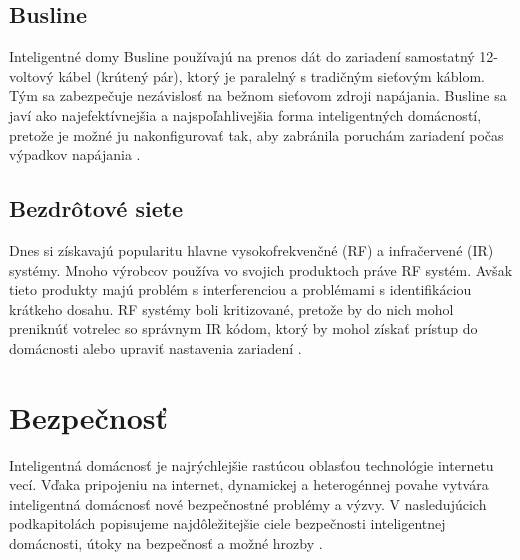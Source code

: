 \documentclass[twoside]{ctuthesis}
\theoremstyle{plain}
\theoremstyle{definition}
\theoremstyle{note}
\begin{document}
\subsection{Busline}
Inteligentné domy Busline používajú na prenos dát do zariadení samostatný 12-voltový kábel (krútený pár), ktorý je paralelný s tradičným sieťovým káblom. Tým sa zabezpečuje nezávislosť na bežnom sieťovom zdroji napájania. Busline sa javí ako najefektívnejšia a najspoľahlivejšia forma inteligentných domácností, pretože je možné ju nakonfigurovať tak, aby zabránila poruchám zariadení počas výpadkov napájania  \cite{networks}.

\subsection{Bezdrôtové siete}
Dnes si získavajú popularitu hlavne vysokofrekvenčné (RF) a infračervené (IR) systémy. Mnoho výrobcov používa vo svojich produktoch práve RF systém. Avšak tieto produkty majú problém s interferenciou a problémami s identifikáciou krátkeho dosahu.
RF systémy boli kritizované, pretože by do nich mohol preniknúť votrelec so správnym IR kódom, ktorý by mohol získať prístup do domácnosti alebo upraviť nastavenia zariadení  \cite{networks}.
\newline

\section{Bezpečnosť} 
Inteligentná domácnosť je najrýchlejšie rastúcou oblasťou technológie internetu vecí. Vďaka pripojeniu na internet, dynamickej a heterogénnej povahe vytvára inteligentná domácnosť nové bezpečnostné problémy a výzvy. V nasledujúcich podkapitolách popisujeme najdôležitejšie ciele bezpečnosti inteligentnej domácnosti, útoky na bezpečnosť a možné hrozby \cite{securitytitle}.
\end{document}
